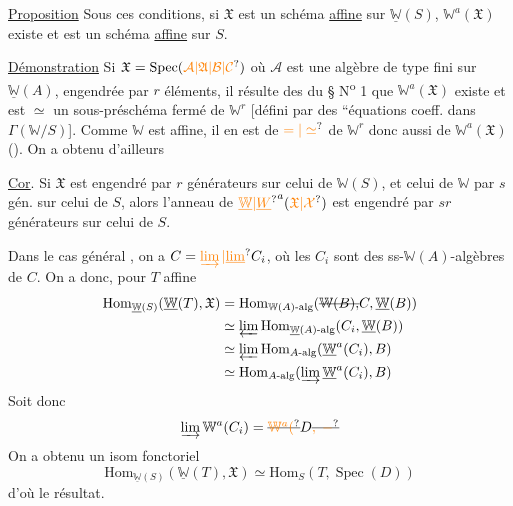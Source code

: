 \uline{Proposition} Sous ces conditions, si  $\mathfrak X$ est un schéma \uline{affine} sur $\underline{\mathbb W}(S)$, $\mathbb W^a(\mathfrak X)$ existe et est un schéma \uline{affine} sur $S$.

\uline{Démonstration}   Si $\mathfrak X=\operatorname{Spec}(\unsure{\mathcal A|\mathfrak A|\mathcal B|\mathcal C})$ où $\mathcal A$ est une algèbre de type fini  sur $\underline{\mathbb W}(A)$, engendrée par $r$ éléments, il résulte des  du \S{} N\textsuperscript{o} 1 que $\mathbb W^a(\mathfrak X)$ existe et est $\simeq$ un sous-préschéma fermé de $\mathbb W^r$ [défini par des ``équations   coeff. dans $\Gamma(\mathbb W/S)$]. Comme $\mathbb W$ est affine, il en est de $\unsure{=|\simeq}$ de  $\mathbb W^r$ donc aussi de $\mathbb W^a(\mathfrak X)$ (). On a obtenu d'ailleurs

\uline{Cor}.    Si $\mathfrak X$ est engendré par $r$ générateurs sur celui de $\mathbb W(S)$, et celui de $\mathbb W$ par $s$ gén. sur celui de $S$, alors
l'anneau de $\unsure{\underline{\mathbb W}|\underline W}^a(\unsure{\mathfrak X|\mathcal X})$ est engendré par $sr$ générateurs sur celui de $S$.

Dans le cas général , on a $C=\unsure{\varinjlim|\underline{\lim}} C_i$, où les $C_i$ sont des ss-$\mathbb W(A)$-algèbres  de $C$. On a donc, pour $T$ affine
\[
\begin{aligned}
\mathrm{Hom}_{\underline{\mathbb W}(S)}(\underline{\mathbb W}(T),\mathfrak X)&=\mathrm{Hom}_{\mathbb W(A)\text{-alg}}(\deleted{\mathbb W(B),}C,\underline{\mathbb W}(B))\\
 &\simeq\varprojlim\mathrm{Hom}_{\underline{\mathbb W}(A)\text{-alg}}(C_i,\underline{\mathbb W}(B))\\
 &\simeq\varprojlim\mathrm{Hom}_{A\text{-alg}}(\underline{\mathbb W}^a(C_i),B)\\
 &\simeq\mathrm{Hom}_{A\text{-alg}}(\varinjlim\underline{\mathbb W}^a(C_i),B)
\end{aligned}
\]
Soit donc
\[
 \varinjlim\mathbb W^a(C_i)=\deleted{\unsure{\mathbb W^a(}}D\deleted{\unsure{,\; -}}
\]
On a obtenu un isom fonctoriel
\[
 \mathrm{Hom}_{\underline{\mathbb W}(S)}(\underline{\mathbb W}(T),\mathfrak X)\simeq\mathrm{Hom}_S(T,\operatorname{Spec}(D))
\]
d'où le résultat.

